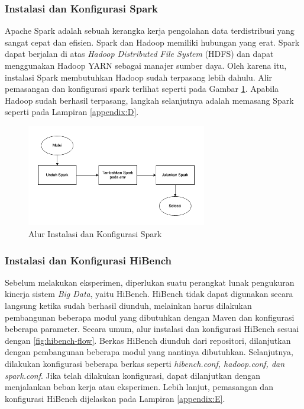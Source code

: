 \subsubsection{Instalasi dan Konfigurasi Spark}
Apache Spark adalah sebuah kerangka kerja pengolahan data terdistribusi yang sangat cepat dan efisien. Spark dan Hadoop memiliki hubungan yang erat. Spark dapat berjalan di atas \textit{Hadoop Distributed File System} (HDFS) dan dapat menggunakan Hadoop YARN sebagai manajer sumber daya. Oleh karena itu, instalasi Spark membutuhkan Hadoop sudah terpasang lebih dahulu. Alir pemasangan dan konfigurasi spark terlihat seperti pada Gambar \ref{fig:spark-flow}. Apabila Hadoop sudah berhasil terpasang, langkah selanjutnya adalah memasang Spark seperti pada Lampiran \ref{appendix:D}.

\begin{figure}[h]
    \centering
    \includegraphics[width=0.7\textwidth]{figures/ch03/spark-flow.png}
    \caption{Alur Instalasi dan Konfigurasi Spark}
    \label{fig:spark-flow}
\end{figure}

\subsubsection{Instalasi dan Konfigurasi HiBench}
Sebelum melakukan eksperimen, diperlukan suatu perangkat lunak pengukuran kinerja sistem \textit{Big Data}, yaitu HiBench. HiBench tidak dapat digunakan secara langsung ketika sudah berhasil diunduh, melainkan harus dilakukan pembangunan beberapa modul yang dibutuhkan dengan Maven dan konfigurasi beberapa parameter. Secara umum, alur instalasi dan konfigurasi HiBench sesuai dengan \ref{fig:hibench-flow}. Berkas HiBench diunduh dari repositori, dilanjutkan dengan pembangunan beberapa modul yang nantinya dibutuhkan. Selanjutnya, dilakukan konfigurasi beberapa berkas seperti \textit{hibench.conf, hadoop.conf, dan spark.conf}. Jika telah dilakukan konfigurasi, dapat dilanjutkan dengan menjalankan beban kerja atau eksperimen. Lebih lanjut, pemasangan dan konfigurasi HiBench dijelaskan pada Lampiran \ref{appendix:E}.

